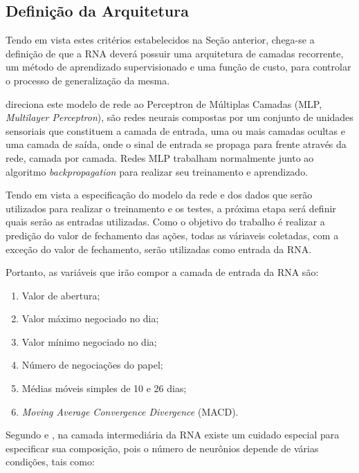 \subsection{Definição da Arquitetura}

Tendo em vista estes critérios estabelecidos na Seção anterior, chega-se a definição de que a RNA deverá possuir uma arquitetura de camadas recorrente, um método de aprendizado supervisionado e uma função de custo, para controlar o processo de generalização da mesma.

 direciona este modelo de rede ao Perceptron de Múltiplas Camadas (MLP, \textit{Multilayer Perceptron}), são redes neurais compostas por um conjunto de unidades sensoriais que constituem a camada de entrada, uma ou mais camadas ocultas e uma camada de saída, onde o sinal de entrada se propaga para frente através da rede, camada por camada. Redes MLP trabalham normalmente junto ao algoritmo \textit{backpropagation} para realizar seu treinamento e aprendizado.

Tendo em vista a especificação do modelo da rede e dos dados que serão utilizados para realizar o treinamento e os testes, a próxima etapa será definir quais serão as entradas utilizadas. Como o objetivo do trabalho é realizar a predição do valor de fechamento das ações, todas as váriaveis coletadas, com a exceção do valor de fechamento, serão utilizadas como entrada da RNA. 

Portanto, as variáveis que irão compor a camada de entrada da RNA são:

\begin{enumerate}
\item Valor de abertura;
\item Valor máximo negociado no dia;
\item Valor mínimo negociado no dia;
\item Número de negociações do papel;
\item Médias móveis simples de 10 e 26 dias;
\item \textit{Moving Average Convergence Divergence} (MACD).
\end{enumerate}

Segundo  e , na camada intermediária da RNA existe um cuidado especial para especificar sua composição, pois o número de neurônios depende de várias condições, tais como:

